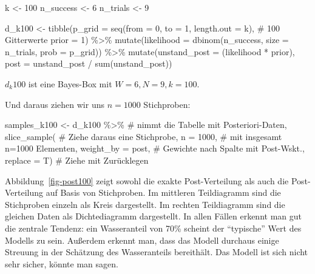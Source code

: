 \documentclass[
  a4paper,
  DIV=11]{scrreprt}
\newenvironment{Shaded}{\begin{snugshade}}{\end{snugshade}}
\newcommand{\AttributeTok}[1]{\textcolor[rgb]{0.40,0.45,0.13}{#1}}
\newcommand{\CommentTok}[1]{\textcolor[rgb]{0.37,0.37,0.37}{#1}}
\newcommand{\DecValTok}[1]{\textcolor[rgb]{0.68,0.00,0.00}{#1}}
\newcommand{\FunctionTok}[1]{\textcolor[rgb]{0.28,0.35,0.67}{#1}}
\newcommand{\NormalTok}[1]{\textcolor[rgb]{0.00,0.23,0.31}{#1}}
\newcommand{\OtherTok}[1]{\textcolor[rgb]{0.00,0.23,0.31}{#1}}
\newcommand{\SpecialCharTok}[1]{\textcolor[rgb]{0.37,0.37,0.37}{#1}}
\theoremstyle{definition}
\theoremstyle{remark}
\begin{document}
\begin{Shaded}
\begin{Highlighting}[]
\NormalTok{k }\OtherTok{\textless{}{-}} \DecValTok{100}
\NormalTok{n\_success }\OtherTok{\textless{}{-}} \DecValTok{6}
\NormalTok{n\_trials  }\OtherTok{\textless{}{-}} \DecValTok{9}

\NormalTok{d\_k100 }\OtherTok{\textless{}{-}}
  \FunctionTok{tibble}\NormalTok{(}\AttributeTok{p\_grid =} \FunctionTok{seq}\NormalTok{(}\AttributeTok{from =} \DecValTok{0}\NormalTok{, }
                      \AttributeTok{to =} \DecValTok{1}\NormalTok{, }
                      \AttributeTok{length.out =}\NormalTok{ k),  }\CommentTok{\# 100 Gitterwerte}
         \AttributeTok{prior  =} \DecValTok{1}\NormalTok{) }\SpecialCharTok{\%\textgreater{}\%} 
  \FunctionTok{mutate}\NormalTok{(}\AttributeTok{likelihood =} \FunctionTok{dbinom}\NormalTok{(n\_success, }
                             \AttributeTok{size =}\NormalTok{ n\_trials, }
                             \AttributeTok{prob =}\NormalTok{ p\_grid)) }\SpecialCharTok{\%\textgreater{}\%} 
  \FunctionTok{mutate}\NormalTok{(}\AttributeTok{unstand\_post =}\NormalTok{ (likelihood }\SpecialCharTok{*}\NormalTok{ prior),}
         \AttributeTok{post =}\NormalTok{ unstand\_post }\SpecialCharTok{/} \FunctionTok{sum}\NormalTok{(unstand\_post))}
\end{Highlighting}
\end{Shaded}

\(d_k100\) ist eine Bayes-Box mit \(W=6, N=9, k=100\).

Und daraus ziehen wir uns \(n=1000\) Stichproben:

\begin{Shaded}
\begin{Highlighting}[]
\NormalTok{samples\_k100 }\OtherTok{\textless{}{-}}
\NormalTok{  d\_k100 }\SpecialCharTok{\%\textgreater{}\%}  \CommentTok{\# nimmt die Tabelle mit Posteriori{-}Daten,}
  \FunctionTok{slice\_sample}\NormalTok{(  }\CommentTok{\# Ziehe daraus eine Stichprobe,}
    \AttributeTok{n =} \DecValTok{1000}\NormalTok{,  }\CommentTok{\# mit insgesamt n=1000 Elementen,}
    \AttributeTok{weight\_by =}\NormalTok{ post,  }\CommentTok{\# Gewichte nach Spalte mit Post{-}Wskt.,}
    \AttributeTok{replace =}\NormalTok{ T)  }\CommentTok{\# Ziehe mit Zurücklegen}
\end{Highlighting}
\end{Shaded}

Abbildung~\ref{fig-post100} zeigt sowohl die exakte Post-Verteilung als
auch die Post-Verteilung auf Basis von Stichproben. Im mittleren
Teildiagramm sind die Stichproben einzeln als Kreis dargestellt. Im
rechten Teildiagramm sind die gleichen Daten als Dichtediagramm
dargestellt. In allen Fällen erkennt man gut die zentrale Tendenz: ein
Wasseranteil von 70\% scheint der ``typische'' Wert des Modells zu sein.
Außerdem erkennt man, dass das Modell durchaus einige Streuung in der
Schätzung des Wasseranteils bereithält. Das Modell ist sich nicht sehr
sicher, könnte man sagen.
\end{document}
